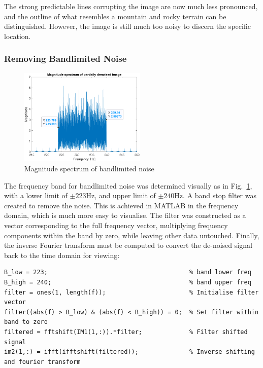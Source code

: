 \documentclass[12pt]{article}
\begin{document}
The strong predictable lines corrupting the image are now much less pronounced,
and the outline of what resembles a mountain and rocky terrain can be
distinguished. However, the image is still much too noisy to discern the
specific location.

\subsubsection*{Removing Bandlimited Noise}

\begin{figure}
    \vspace*{-12pt}
    \centering
    \includegraphics[width=6cm]{figures/p2-bandnoise.png}
    \caption{Magnitude spectrum of bandlimited noise\label{fig:p2-bandnoise}}
\end{figure}

The frequency band for bandlimited noise was determined visually as in
Fig.~\ref{fig:p2-bandnoise}, with a lower limit of $\pm 223$Hz, and upper limit
of $\pm 240$Hz. A band stop filter was created to remove the noise. This is
achieved in MATLAB in the frequency domain, which is much more easy to
visualise. The filter was constructed as a vector corresponding to the full
frequency vector, multiplying frequency components within the band by zero,
while leaving other data untouched. Finally, the inverse Fourier transform must
be computed to convert the de-noised signal back to the time domain for
viewing:
\begin{verbatim}
B_low = 223;                                       % band lower freq 
B_high = 240;                                      % band upper freq
filter = ones(1, length(f));                       % Initialise filter vector
filter((abs(f) > B_low) & (abs(f) < B_high)) = 0;  % Set filter within band to zero
filtered = fftshift(IM1(1,:)).*filter;             % Filter shifted signal
im2(1,:) = ifft(ifftshift(filtered));              % Inverse shifting and fourier transform
\end{verbatim}
\end{document}
